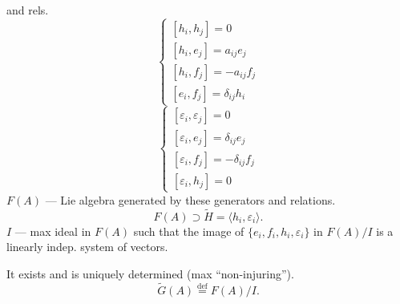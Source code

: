 and rels.
\[
\begin{cases}
[h_i,h_j]=0\\
[h_i,e_j]=a_{ij}e_j\\
[h_i,f_j]=-a_{ij}f_j\\
[e_i,f_j]=\delta_{ij}h_i
\end{cases}
\]
\[
\begin{cases}
[\varepsilon_i,\varepsilon_j]=0\\
[\varepsilon_i,e_j]=\delta_{ij}e_j\\
[\varepsilon_i,f_j]=-\delta_{ij}f_j\\
[\varepsilon_i,h_j]=0
\end{cases}
\]
$F(A)$ --- Lie algebra generated by these generators and relations.
\[
F(A)\supset\widetilde H=\langle h_i,\varepsilon_i\rangle.
\]
$I$ --- max ideal in $F(A)$ such that the image of $\{e_i,f_i,h_i,\varepsilon_i\}$ in $F(A)/I$ is a linearly indep. system of vectors.

It exists and is uniquely determined (max “non-injuring”).
\[
\widetilde G(A)\overset{\mathrm{def}}{=}F(A)/I.
\]


